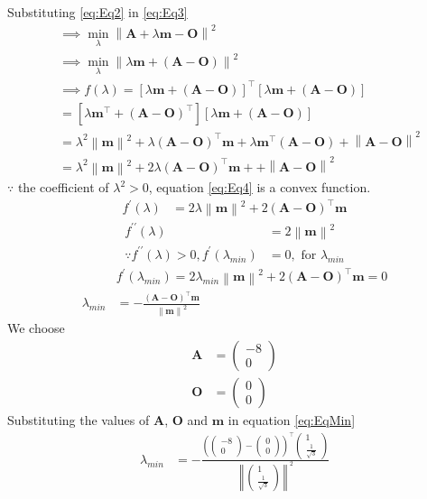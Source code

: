 \documentclass[12pt]{article}
\providecommand{\brak}[1]{\ensuremath{\left(#1\right)}}
\providecommand{\sbrak}[1]{\ensuremath{{}\left[#1\right]}}
\providecommand{\norm}[1]{\left\lVert#1\right\rVert}
\newcommand{\myvec}[1]{\ensuremath{\begin{pmatrix}#1\end{pmatrix}}}
\let\vec\mathbf
\begin{document}
\begin{enumerate}
\begin{enumerate}
Substituting \eqref{eq:Eq2} in \eqref{eq:Eq3}
\begin{align}
	& \implies \min_{\lambda} \norm{ \vec{A}+\lambda\vec{m} -\vec{O}}^2\\
	& \implies \min_{\lambda} \norm{ \lambda\vec{m} +\brak{\vec{A}-\vec{O}}}^2\\
	&\implies f\brak{\lambda} = \sbrak{\lambda\vec{m}+ \brak{\vec{A}-\vec{O}}}^\top \sbrak{\lambda\vec{m}+ \brak{\vec{A}-\vec{O}}} \\  
	&= \sbrak{\lambda\vec{m^\top}+ \brak{\vec{A}-\vec{O}}^\top} \sbrak{\lambda\vec{m}+ \brak{\vec{A}-\vec{O}}} \\  
	&= \lambda^2\norm{\vec{m}}^2+ \lambda\brak{\vec{A}-\vec{O}}^\top\vec{m}+ \lambda\vec{m}^\top\brak{\vec{A}-\vec{O}}+ \norm{\vec{A}-\vec{O}}^2 \\  
	\label{eq:Eq4}
	&= \lambda^2\norm{\vec{m}}^2+ 2\lambda\brak{\vec{A}-\vec{O}}^\top\vec{m}+ + \norm{\vec{A}-\vec{O}}^2  
\end{align}
$\because$ the coefficient of $\lambda^2> 0$, equation \eqref{eq:Eq4} is a convex function.
\begin{align}
	f^\prime\brak{\lambda} &= 2\lambda\norm{\vec{m}}^2+ 2\brak{\vec{A}-\vec{O}}^\top\vec{m}
\end{align}	
\begin{align}
	f^{\prime\prime}\brak{\lambda} &= 2\norm{\vec{m}}^2 \\ 
	\because f^{\prime\prime}\brak{\lambda} > 0, f^\prime\brak{\lambda_{min}} &= 0, \text{ for } \lambda_{min}
\end{align}
\begin{align}
	& f^\prime\brak{\lambda_{min}} =  2\lambda_{min}\norm{\vec{m}}^2 + 2\brak{\vec{A}-\vec{O}}^\top\vec{m}  = 0 \\
	\label{eq:EqMin}
	\lambda_{min} &= -\frac{\brak{\vec{A}-\vec{O}}^\top\vec{m}}{\norm{\vec{m}}^2} 
\end{align}
We choose  
\begin{align}
	\vec{A} &= \myvec{-8 \\ 0}\\
	\vec{O} &= \myvec{ 0 \\ 0}
\end{align}
Substituting the values of $\vec{A}$, $\vec{O}$ and $\vec{m}$ in equation \eqref{eq:EqMin}
\begin{align}
	\lambda_{min} &= -\frac{\brak{\myvec{-8 \\ 0 }-\myvec{0 \\ 0}}^\top\myvec{1 \\ \frac{1}{\sqrt{3}}}}{\norm{\myvec{1 \\ \frac{1}{\sqrt{3}}}}^2}\\ 

\end{align}
\end{enumerate}
\end{enumerate}
\end{document}
